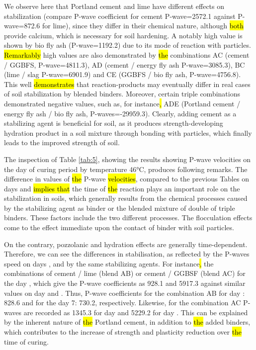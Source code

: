 \documentclass[materials,article,submit,pdftex,moreauthors]{Definitions/mdpi}
\begin{document}
We observe here that Portland cement and lime have different effects on stabilization (compare P-wave coefficient for cement P-wave=2572.1 against P-wave=872.6 for lime), since they differ in their chemical nature, although \hl{both} provide calcium, which is necessary for soil hardening. A notably high value is shown by bio fly ash (P-wave=1192.2) due to its mode of reaction with particles. \hl{Remarkably} high values are also demonstrated by \hl{the} combinations AC (cement / GGBFS, P-wave=4811.3), AD (cement / energy fly ash P-wave=3085.3), BC (lime / slag P-wave=6901.9) and CE (GGBFS / bio fly ash, P-wave=4756.8). This well \hl{demonstrates} that reaction-products may eventually differ in real cases of soil stabilization by blended binders. Moreover, certain triple combinations demonstrated negative values, such as, for instance\hl{,} ADE (Portland cement / energy fly ash / bio fly ash, P-waves=-29959.3). Clearly, adding cement as a stabilizing agent is beneficial for soil, as it produces strength-developing hydration product in a soil mixture through bonding with particles, which finally leads to the improved strength of soil. 

The inspection of Table \ref{tab:5}, showing the results showing P-wave velocities on the day  of curing period by temperature 46°C, produces following remarks. The difference in values of \hl{the} P-wave \hl{velocities}, compared to the previous Tables on days  and  \hl{implies that} the time of \hl{the} reaction plays an important role on the stabilization in soils, which generally results from the chemical processes caused by the stabilizing agent as binder or the blended mixture of double of triple binders. These factors include the two different processes. The flocculation effects come to the effect immediate upon the contact of binder with soil particles.

On the contrary, pozzolanic and hydration effects are generally time-dependent. Therefore, we can see the differences in stabilisation, as reflected by the P-waves speed on days  ,  and  by the same stabilizing agents. For instance\hl{, }the combinations of cement / lime (blend AB) or cement / GGBSF (blend AC) for the day , which give the P-wave coefficients as 928.1 and 5917.3 against similar values on day  and . Thus, P-wave coefficients for the combination AB for day :  828.6 and for the day 7: 730.2, respectively. Likewise, for the combination AC P-waves are recorded as 1345.3 for day  and 5229.2 for day . This can be explained by the inherent nature of\hl{ the }Portland cement, in addition to \hl{the} added binders, which contributes to the increase of strength and plasticity reduction over \hl{the} time of curing. 
\end{document}
